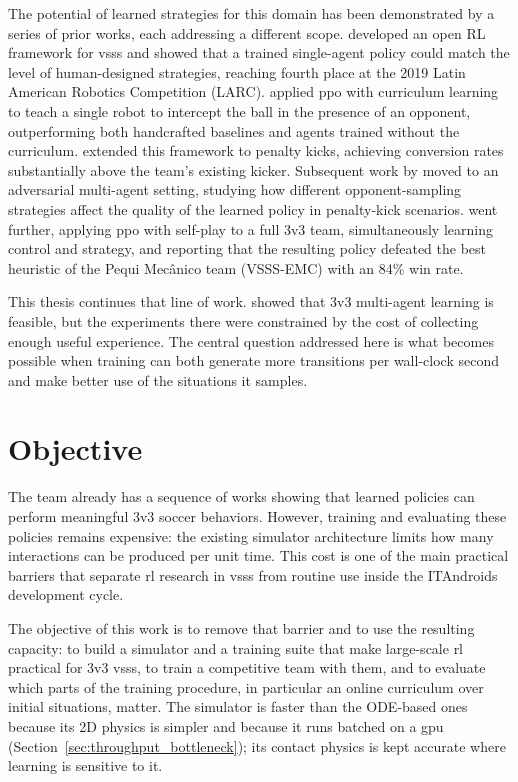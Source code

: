 The potential of learned strategies for this domain has been demonstrated by
a series of prior works, each addressing a different scope. \textcite{bassani2020}
developed an open RL framework for \gls{vsss} and showed that
a trained single-agent policy could match the level of human-designed
strategies, reaching fourth place at the 2019 Latin American Robotics
Competition (LARC). \textcite{medeiros2020} applied \gls{ppo}
with curriculum learning to teach a single robot to intercept the ball in the
presence of an opponent, outperforming both handcrafted baselines and agents
trained without the curriculum.  \textcite{tg_thay} extended
this framework to penalty kicks, achieving conversion rates substantially above
the team's existing kicker.  Subsequent work by \textcite{master_thay} moved to an adversarial multi-agent setting, studying how
different opponent-sampling strategies affect the quality of the learned policy
in penalty-kick scenarios.  \textcite{brandao2022} went
further, applying \gls{ppo} with self-play to a full 3v3 team, simultaneously
learning control and strategy, and reporting that the resulting policy
defeated the best heuristic of the Pequi Mec\^anico team (VSSS-EMC) with an 84\% win
rate.

This thesis continues that line of work.  \textcite{brandao2022} showed
that 3v3 multi-agent learning is feasible, but the experiments there were
constrained by the cost of collecting enough useful experience.  The central
question addressed here is what becomes possible when training can both
generate more transitions per wall-clock second and make better use of the
situations it samples.

\section{Objective}

The team already has a sequence of works showing that learned policies can
perform meaningful 3v3 soccer behaviors.  However, training and evaluating
these policies remains expensive: the existing simulator architecture limits
how many interactions can be produced per unit time.  This cost is one of the main
practical barriers that separate \gls{rl} research in \gls{vsss} from routine
use inside the ITAndroids development cycle.

The objective of this work is to remove that barrier and to use the resulting capacity: to build a simulator and a training
suite that make large-scale \gls{rl} practical for 3v3 \gls{vsss}, to train a competitive team with them, and to evaluate which parts of the training
procedure, in particular an online curriculum over initial situations, matter.  The simulator is faster than the ODE-based ones because its 2D physics is simpler and because it runs batched on a \gls{gpu} (Section~\ref{sec:throughput_bottleneck}); its contact physics is
kept accurate where learning is sensitive to it.

